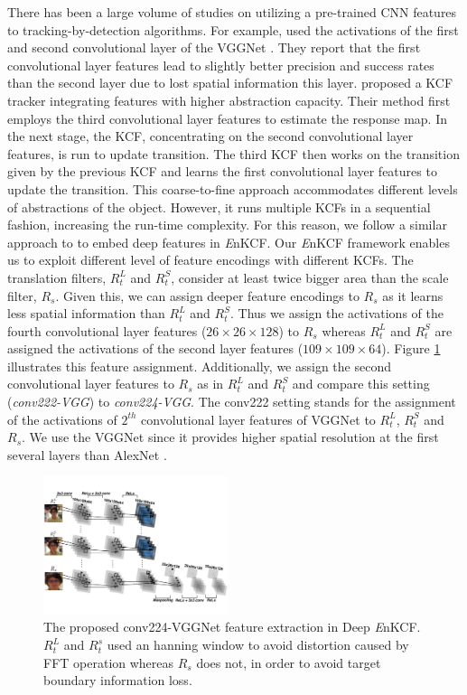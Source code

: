 \documentclass[10pt,twocolumn,letterpaper]{article}
\begin{document}
There has been a large volume of studies on utilizing a pre-trained
CNN features to tracking-by-detection algorithms. For example,
\cite{danelljan2015convolutional} used the activations of the first
and second convolutional layer of the VGGNet \cite{simonyan2014very}.
They report that the first convolutional layer features lead to
slightly better precision and success rates than the second layer due
to lost spatial information this layer. \cite{ma2015hierarchical}
proposed a KCF tracker integrating features with higher abstraction
capacity.  Their method first employs the third convolutional layer
features to estimate the response map. In the next stage, the KCF,
concentrating on the second convolutional layer features, is run to
update transition. The third KCF then works on the transition given by
the previous KCF and learns the first convolutional layer features to
update the transition. This coarse-to-fine approach accommodates
different levels of abstractions of the object. However, it runs
multiple KCFs in a sequential fashion, increasing the run-time
complexity. For this reason, we follow a similar approach to
\cite{danelljan2015convolutional} to embed deep features in {\it
  E}nKCF. Our {\it E}nKCF framework enables us to exploit different
level of feature encodings with different KCFs. The translation
filters, $R_{t}^{L}$ and $R_{t}^{S}$, consider at least twice bigger
area than the scale filter, $R_{s}$. Given this, we can assign deeper
feature encodings to $R_{s}$ as it learns less spatial information
than $R_{t}^{L}$ and $R_{t}^{S}$. Thus we assign the activations of
the fourth convolutional layer features ($26\times26\times128$) to
$R_{s}$ whereas $R_{t}^{L}$ and $R_{t}^{S}$ are assigned the
activations of the second layer features
($109\times109\times64$). Figure \ref{fig:Filters_CNN} illustrates
this feature assignment. Additionally, we assign the second
convolutional layer features to $R_{s}$ as in $R_{t}^{L}$ and
$R_{t}^{S}$ and compare this setting (\textit{conv222-VGG}) to
\textit{conv224-VGG}. The conv222 setting stands for the assignment of 
the activations of $2^{th}$ convolutional layer features
of VGGNet to $R_{t}^{L}$, $R_{t}^{S}$ and $R_{s}$. We use the VGGNet 
since it provides higher spatial resolution at the first several layers than AlexNet
\cite{krizhevsky2012imagenet}.

\begin{figure}[!h]
\centering
\includegraphics[width=0.48\textwidth]{./figures/Filters_Details_CNN.pdf}
\caption{The proposed conv224-VGGNet feature extraction in Deep{\it
    E}nKCF. $R_{t}^{L}$ and $R_{t}^{s}$ used an hanning window to
  avoid distortion caused by FFT operation whereas $R_{s}$ does not,
  in order to avoid target boundary information loss.}
\label{fig:Filters_CNN}
\end{figure}
\end{document}
